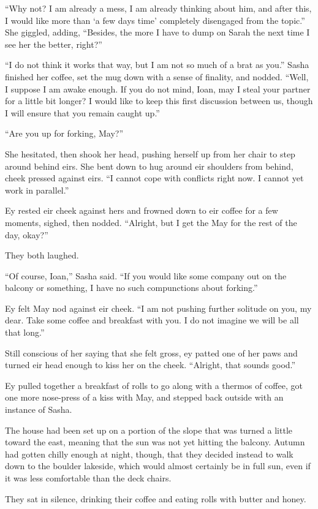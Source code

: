 ``Why not? I am already a mess, I am already thinking about him, and after this, I would like more than `a few days time' completely disengaged from the topic.'' She giggled, adding, ``Besides, the more I have to dump on Sarah the next time I see her the better, right?''

``I do not think it works that way, but I am not so much of a brat as you.'' Sasha finished her coffee, set the mug down with a sense of finality, and nodded. ``Well, I suppose I am awake enough. If you do not mind, Ioan, may I steal your partner for a little bit longer? I would like to keep this first discussion between us, though I will ensure that you remain caught up.''

``Are you up for forking, May?''

She hesitated, then shook her head, pushing herself up from her chair to step around behind eirs. She bent down to hug around eir shoulders from behind, cheek pressed against eirs. ``I cannot cope with conflicts right now. I cannot yet work in parallel.''

Ey rested eir cheek against hers and frowned down to eir coffee for a few moments, sighed, then nodded. ``Alright, but I get the May for the rest of the day, okay?''

They both laughed.

``Of course, Ioan,'' Sasha said. ``If you would like some company out on the balcony or something, I have no such compunctions about forking.''

Ey felt May nod against eir cheek. ``I am not pushing further solitude on you, my dear. Take some coffee and breakfast with you. I do not imagine we will be all that long.''

Still conscious of her saying that she felt gross, ey patted one of her paws and turned eir head enough to kiss her on the cheek. ``Alright, that sounds good.''

Ey pulled together a breakfast of rolls to go along with a thermos of coffee, got one more nose-press of a kiss with May, and stepped back outside with an instance of Sasha.

The house had been set up on a portion of the slope that was turned a little toward the east, meaning that the sun was not yet hitting the balcony. Autumn had gotten chilly enough at night, though, that they decided instead to walk down to the boulder lakeside, which would almost certainly be in full sun, even if it was less comfortable than the deck chairs.

They sat in silence, drinking their coffee and eating rolls with butter and honey.

